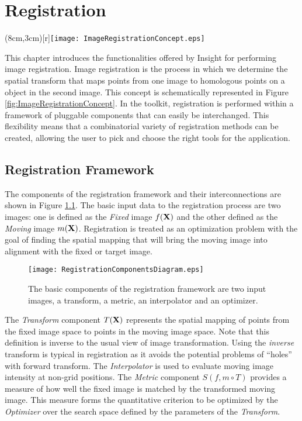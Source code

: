 
\chapter{Registration}

\parpic(8cm,3cm)[r]{\texttt{[image: ImageRegistrationConcept.eps]}}
  
This chapter introduces the functionalities offered by Insight for performing
image registration. Image registration is the process in which we determine the
spatial transform that maps points from one image to homologous points on a
object in the second image. This concept is schematically represented in Figure
\ref{fig:ImageRegistrationConcept}. In the toolkit, registration is performed
within a framework of pluggable components that can easily be interchanged.
This flexibility means that a combinatorial variety of registration methods can
be created, allowing the user to pick and choose the right tools for the
application.


\section{Registration Framework}
The components of the registration framework and their interconnections 
are shown in Figure \ref{fig:RegistrationComponents}. The basic
input data to the registration process are two images: one
is defined as the \emph{Fixed} image $f(\bf{X})$ and the other defined as the
\emph{Moving} image $m(\bf{X})$. Registration is treated as an optimization problem
with the goal of finding the spatial mapping that will bring the moving image into 
alignment with the fixed or target image.

\begin{figure}
\center
\texttt{[image: RegistrationComponentsDiagram.eps]}
\caption{The basic components of the registration framework are two input images,
a transform, a metric, an interpolator and an optimizer.}
\label{fig:RegistrationComponents}
\end{figure}

The \emph{Transform} component $T(\bf{X})$ represents the spatial mapping of
points from the fixed image space to points in the moving image space. Note
that this definition is inverse to the usual view of image transformation.
Using the \emph{inverse} transform is typical in registration as it avoids the
potential problems of ``holes'' with forward transform. The \emph{Interpolator}
is used to evaluate moving image intensity at non-grid positions. The
\emph{Metric} component $S(f,m \circ T)$ provides a measure of how well the
fixed image is matched by the transformed moving image. This measure forms the
quantitative criterion to be optimized by the \emph{Optimizer} over the search
space defined by the parameters of the \emph{Transform}.

